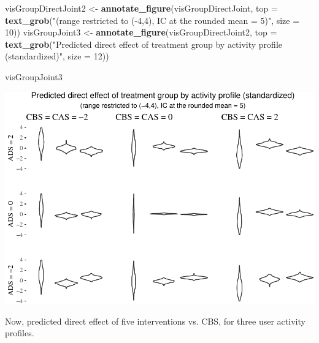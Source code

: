\documentclass[10pt,dvipsnames,enabledeprecatedfontcommands]{scrartcl}
\newenvironment{Shaded}{\begin{snugshade}}{\end{snugshade}}
\newcommand{\KeywordTok}[1]{\textcolor[rgb]{0.13,0.29,0.53}{\textbf{#1}}}
\newcommand{\DataTypeTok}[1]{\textcolor[rgb]{0.13,0.29,0.53}{#1}}
\newcommand{\DecValTok}[1]{\textcolor[rgb]{0.00,0.00,0.81}{#1}}
\newcommand{\StringTok}[1]{\textcolor[rgb]{0.31,0.60,0.02}{#1}}
\newcommand{\NormalTok}[1]{#1}
\begin{document}
\begin{Shaded}
\begin{Highlighting}[]
\NormalTok{visGroupDirectJoint2 <-}\StringTok{ }\KeywordTok{annotate_figure}\NormalTok{(visGroupDirectJoint, }
                                  \DataTypeTok{top =} \KeywordTok{text_grob}\NormalTok{(}\StringTok{"(range restricted to (-4,4), IC at the rounded mean = 5)"}\NormalTok{,}
                                                  \DataTypeTok{size =} \DecValTok{10}\NormalTok{))}
\NormalTok{visGroupJoint3 <-}\StringTok{ }\KeywordTok{annotate_figure}\NormalTok{(visGroupDirectJoint2, }
                                  \DataTypeTok{top =} \KeywordTok{text_grob}\NormalTok{(}\StringTok{"Predicted direct effect of treatment group by activity profile (standardized)"}\NormalTok{,}
                                                  \DataTypeTok{size =} \DecValTok{12}\NormalTok{))}

\NormalTok{visGroupJoint3}
\end{Highlighting}
\end{Shaded}

\begin{center}\includegraphics[width=1\linewidth]{bayesianReport3_files/figure-latex/unnamed-chunk-17-1} \end{center}

\normalsize

Now, predicted direct effect of five interventions vs. \textsf{CBS}, for
three user activity profiles.

\vspace{1mm} \footnotesize
\end{document}
